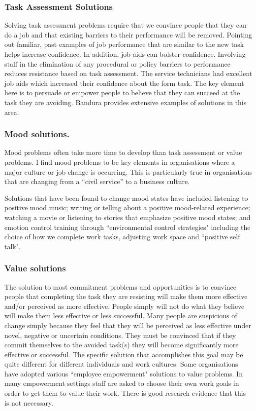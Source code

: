\subsubsection{Task Assessment Solutions}

Solving task assessment problems require that we convince people that they can do a job and that existing barriers to their performance will be removed. Pointing out familiar, past examples of job performance that are similar to the new task helps increase confidence. In addition, job aids can bolster confidence. Involving staff in the elimination of any procedural or policy barriers to performance reduces resistance based on task assessment. The service technicians had excellent job aids which increased their confidence about the form task. The key element here is to persuade or empower people to believe that they can succeed at the task they are avoiding. Bandura provides extensive examples of solutions in this area.

\subsubsection{Mood solutions.}

Mood problems often take more time to develop than task assessment or value problems. I find mood problems to be key elements in organisations where a major culture or job change is occurring. This is particularly true in organisations that are changing from a “civil service” to a business culture.

Solutions that have been found to change mood states have included listening to positive mood music; writing or telling about a positive mood-related experience; watching a movie or listening to stories that emphasize positive mood states; and emotion control training through ``environmental control strategies" including the choice of how we complete work tasks, adjusting work space and ``positive self talk".

\subsubsection{Value solutions}

The solution to most commitment problems and opportunities is to convince people that completing the task they are resisting will make them more effective and/or perceived as more effective. People simply will not do what they believe will make them less effective or less successful. Many people are suspicious of change simply because they feel that they will be perceived as less effective under novel, negative or uncertain conditions. They must be convinced that if they commit themselves to the avoided task(s) they will become significantly more effective or successful. The specific solution that accomplishes this goal may be quite different for different individuals and work cultures. Some organisations have adopted various ``employee empowerment" solutions to value problems. In many empowerment settings staff are asked to choose their own work goals in order to get them to value their work. There is good research evidence that this is not necessary.

